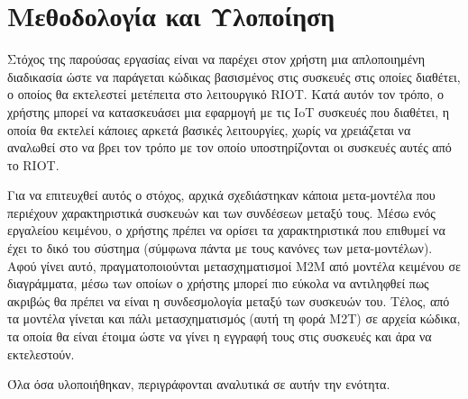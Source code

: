 \chapter{Μεθοδολογία και Υλοποίηση}
\label{chapter:implementations}

Στόχος της παρούσας εργασίας είναι να παρέχει στον χρήστη μια απλοποιημένη διαδικασία ώστε να παράγεται κώδικας βασισμένος στις συσκευές στις οποίες διαθέτει, ο οποίος θα εκτελεστεί μετέπειτα στο λειτουργικό RIOT. Κατά αυτόν τον τρόπο, ο χρήστης μπορεί να κατασκευάσει μια εφαρμογή με τις IoT συσκευές που διαθέτει, η οποία θα εκτελεί κάποιες αρκετά βασικές λειτουργίες, χωρίς να χρειάζεται να αναλωθεί στο να βρει τον τρόπο με τον οποίο υποστηρίζονται οι συσκευές αυτές από το RIOT.

Για να επιτευχθεί αυτός ο στόχος, αρχικά σχεδιάστηκαν κάποια μετα-μοντέλα που περιέχουν χαρακτηριστικά συσκευών και των συνδέσεων μεταξύ τους. Μέσω ενός εργαλείου κειμένου, ο χρήστης πρέπει να ορίσει τα χαρακτηριστικά που επιθυμεί να έχει το δικό του σύστημα (σύμφωνα πάντα με τους κανόνες των μετα-μοντέλων). Αφού γίνει αυτό, πραγματοποιούνται μετασχηματισμοί M2M από μοντέλα κειμένου σε διαγράμματα, μέσω των οποίων ο χρήστης μπορεί πιο εύκολα να αντιληφθεί πως ακριβώς θα πρέπει να είναι η συνδεσμολογία μεταξύ των συσκευών του. Τέλος, από τα μοντέλα γίνεται και πάλι μετασχηματισμός (αυτή τη φορά M2T) σε αρχεία κώδικα, τα οποία θα είναι έτοιμα ώστε να γίνει η εγγραφή τους στις συσκευές και άρα να εκτελεστούν.

Όλα όσα υλοποιήθηκαν, περιγράφονται αναλυτικά σε αυτήν την ενότητα.







